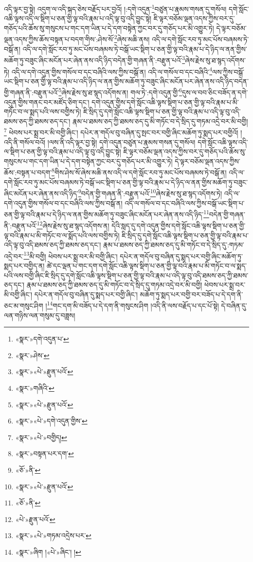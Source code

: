 འདི་ལྟར་བྱ་སྟེ། འདུག་ལ་འདི་སྐད་ཅེས་བརྗོད་པར་བྱའོ། །:དགེ་འདུན་\footnote{«སྣར་»དགེ་འདུན་པ་}བཙུན་པ་རྣམས་གསན་དུ་གསོལ། དགེ་སློང་འཆི་ལྟས་འདི་ལ་སྡིག་པ་ཅན་གྱི་ལྟ་བའི་རྣམ་པ་འདི་ལྟ་བུ་འདི་བྱུང་སྟེ། ཇི་ལྟར་བཅོམ་ལྡན་འདས་ཀྱིས་བར་དུ་གཅོད་པའི་ཆོས་སུ་གསུངས་པ་གང་དག་ཡིན་པ་དེ་དག་བསྟེན་ཀྱང་བར་དུ་གཅོད་པར་མི་འགྱུར་ཏེ། དེ་ལྟར་བཅོམ་ལྡན་འདས་ཀྱིས་ཆོས་བསྟན་པ་བདག་གིས་:ཤེས་སོ་\footnote{«སྣར་»ཤེས་}ཞེས་མཆི་ནས། འདི་ལ་དགེ་སློང་རབ་ཏུ་མང་པོས་བཞམས་ཏེ་བསྒོ་ན། འདི་ལ་དགེ་སློང་རབ་ཏུ་མང་པོས་བཞམས་ཏེ་བསྒོ་ཡང་སྡིག་པ་ཅན་གྱི་ལྟ་བའི་རྣམ་པ་དེ་ཉིད་ལ་ནན་གྱིས་མཆོག་ཏུ་བཟུང་ཞིང་མངོན་པར་ཞེན་ནས་འདི་ཉིད་བདེན་གྱི་གཞན་ནི་:བརྫུན་པའོ་\footnote{«སྣར་»«པེ་»རྫུན་པའོ་}ཞེས་རྗེས་སུ་ཐ་སྙད་འདོགས་ཏེ། འདི་ལ་དགེ་འདུན་གྱིས་གསོལ་བ་དང་བཞིའི་ལས་ཀྱིས་བསྒོ་ན། འདི་ལ་གསོལ་བ་དང་བཞིའི་\footnote{«སྣར་»གཞིའི་}ལས་ཀྱིས་བསྒོ་ཡང་སྡིག་པ་ཅན་གྱི་ལྟ་བའི་རྣམ་པ་འདི་ཉིད་ལ་ནན་གྱིས་མཆོག་ཏུ་བཟུང་ཞིང་མངོན་པར་ཞེན་ནས་འདི་ཉིད་བདེན་གྱི་གཞན་ནི་:བརྫུན་པའོ་\footnote{«སྣར་»«པེ་»རྫུན་པའོ་}ཞེས་རྗེས་སུ་ཐ་སྙད་འདོགས་ན། གལ་ཏེ་:དགེ་འདུན་གྱི་\footnote{«སྣར་»«པེ་»དགེ་འདུན་གྱིས་}དུས་ལ་བབ་ཅིང་བཟོད་ན་དགེ་འདུན་གྱིས་གནང་བར་མཛོད་ཅིག་དང་། དགེ་འདུན་གྱིས་དགེ་སློང་འཆི་ལྟས་སྡིག་པ་ཅན་གྱི་ལྟ་བའི་རྣམ་པ་མི་གཏོང་བ་ལ་སྨད་པའི་ལས་བགྱིས་ཏེ། ཇི་སྲིད་དུ་དགེ་སློང་འཆི་ལྟས་སྡིག་པ་ཅན་གྱི་ལྟ་བའི་རྣམ་པ་འདི་ལྟ་བུ་འདི་ཐམས་ཅད་ཀྱི་ཐམས་ཅད་དང་། རྣམ་པ་ཐམས་ཅད་ཀྱི་ཐམས་ཅད་དུ་མི་གཏོང་བ་དེ་སྲིད་དུ་གཏམ་འདྲེ་བར་མི་བགྱི།\footnote{«སྣར་»«པེ་»བགྱིད།} ཕེབས་པར་སྨྲ་བར་མི་བགྱི་ཞིང་། དཔེར་ན་གདོལ་བུ་བཞིན་དུ་སྤང་བར་བགྱི་ཞིང་མཆོག་ཏུ་སྨད་པར་བགྱིའོ། །འདི་ནི་གསོལ་བའོ། །ལས་ནི་འདི་ལྟར་བྱ་སྟེ། དགེ་འདུན་བཙུན་པ་རྣམས་གསན་དུ་གསོལ། དགེ་སློང་འཆི་ལྟས་འདི་ལ་སྡིག་པ་ཅན་གྱི་ལྟ་བའི་རྣམ་པ་འདི་ལྟ་བུ་འདི་བྱུང་སྟེ། ཇི་ལྟར་བཅོམ་ལྡན་འདས་ཀྱིས་བར་དུ་གཅོད་པའི་ཆོས་སུ་གསུངས་པ་གང་དག་ཡིན་པ་དེ་དག་བསྟེན་ཀྱང་བར་དུ་གཅོད་པར་མི་འགྱུར་ཏེ། དེ་ལྟར་བཅོམ་ལྡན་འདས་ཀྱིས་ཆོས་:བསྟན་པ་བདག་\footnote{«སྣར་»བསྟན་པར་དག་}གིས་ཤེས་སོ་ཞེས་མཆི་ནས་འདི་ལ་དགེ་སློང་རབ་ཏུ་མང་པོས་བཞམས་ཏེ་བསྒོ་ན། འདི་ལ་དགེ་སློང་རབ་ཏུ་མང་པོས་བཞམས་ཏེ་བསྒོ་ཡང་སྡིག་པ་ཅན་གྱི་ལྟ་བའི་རྣམ་པ་དེ་ཉིད་ལ་ནན་གྱིས་མཆོག་ཏུ་བཟུང་ཞིང་མངོན་པར་ཞེན་ནས་འདི་ཉིད་\footnote{«ཅོ་»ནི་}བདེན་གྱི་གཞན་ནི་:བརྫུན་པའོ་\footnote{«སྣར་»«པེ་»རྫུན་པའོ་}ཞེས་རྗེས་སུ་ཐ་སྙད་འདོགས་ཏེ། འདི་ལ་དགེ་འདུན་གྱིས་གསོལ་བ་དང་བཞིའི་ལས་ཀྱིས་བསྒོ་ན། འདི་ལ་གསོལ་བ་དང་བཞིའི་ལས་ཀྱིས་བསྒོ་ཡང་སྡིག་པ་ཅན་གྱི་ལྟ་བའི་རྣམ་པ་དེ་ཉིད་ལ་ནན་གྱིས་མཆོག་ཏུ་བཟུང་ཞིང་མངོན་པར་ཞེན་ནས་འདི་ཉིད་\footnote{«ཅོ་»ནི་}བདེན་གྱི་གཞན་ནི་:བརྫུན་པའོ་\footnote{«པེ་»རྫུན་པའོ་}ཞེས་རྗེས་སུ་ཐ་སྙད་འདོགས་ན། དེའི་སླད་དུ་དགེ་འདུན་གྱིས་དགེ་སློང་འཆི་ལྟས་སྡིག་པ་ཅན་གྱི་ལྟ་བའི་རྣམ་པ་མི་གཏོང་བ་ལ་སྨོད་པའི་ལས་བགྱིས་ཏེ། ཇི་སྲིད་དུ་དགེ་སློང་འཆི་ལྟས་སྡིག་པ་ཅན་གྱི་ལྟ་བའི་རྣམ་པ་འདི་ལྟ་བུ་འདི་ཐམས་ཅད་ཀྱི་ཐམས་ཅད་དང་། རྣམ་པ་ཐམས་ཅད་ཀྱི་ཐམས་ཅད་དུ་མི་གཏོང་བ་དེ་སྲིད་དུ་:གཏམ་འདྲེ་བར་\footnote{«སྣར་»«པེ་»གཏམ་འདྲེས་པར་}མི་བགྱི། ཕེབས་པར་སྨྲ་བར་མི་བགྱི་ཞིང་། དཔེར་ན་གདོལ་བུ་བཞིན་དུ་སྨད་པར་བགྱི་ཞིང་མཆོག་ཏུ་སྨད་པར་བགྱིད་ན། ཚེ་དང་ལྡན་པ་གང་དག་དགེ་སློང་འཆི་ལྟས་སྡིག་པ་ཅན་གྱི་ལྟ་བའི་རྣམ་པ་མི་གཏོང་བ་ལ་སྨད་པའི་ལས་བགྱི་ཞིང་ཇི་སྲིད་དུ་དགེ་སློང་འཆི་ལྟས་སྡིག་པ་ཅན་གྱི་ལྟ་བའི་རྣམ་པ་འདི་ལྟ་བུ་འདི་ཐམས་ཅད་ཀྱི་ཐམས་ཅད་དང་། རྣམ་པ་ཐམས་ཅད་ཀྱི་ཐམས་ཅད་དུ་མི་གཏོང་བ་དེ་སྲིད་དུ་གཏམ་འདྲེ་བར་མི་བགྱི། ཕེབས་པར་སྨྲ་བར་མི་བགྱི་ཞིང་། དཔེར་ན་གདོལ་བུ་བཞིན་དུ་སྨད་པར་བགྱི་ཞིང་། མཆོག་ཏུ་སྨད་པར་བགྱི་བར་བཟོད་པ་དེ་དག་ནི་ཅང་མ་གསུང་ཤིག །\footnote{«སྣར་»ཞིག །«པེ་»ཞིང་། །}གང་དག་མི་བཟོད་པ་དེ་དག་ནི་གསུངས་ཤིག །འདི་ནི་ལས་བརྗོད་པ་དང་པོ་སྟེ། དེ་བཞིན་དུ་ལན་གཉིས་ལན་གསུམ་དུ་བཟླས། 